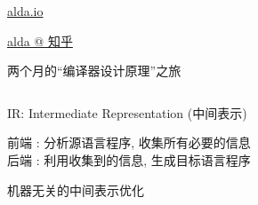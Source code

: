 \begin{frame}{}
  \begin{center}
    \href{https://alda.io/}{alda.io}


    \href{https://www.zhihu.com/zvideo/1467997225217908736}{alda @ 知乎}
  \end{center}
\end{frame}

\begin{frame}{}
  \begin{center}
    {\large 两个月的``编译器设计原理''之旅}

    \vspace{0.30cm}
    \begin{columns}
    \end{columns}
  \end{center}
\end{frame}


\begin{frame}{}
  \begin{center}
    IR: Intermediate Representation (中间表示)
    \vspace{0.50cm}


    \vspace{0.50cm}
    前端 : 分析源语言程序, 收集所有必要的信息 \\[8pt]
    后端 : 利用收集到的信息, 生成目标语言程序
  \end{center}
\end{frame}

\begin{frame}{}
  \begin{center}

    \vspace{0.50cm}
    机器无关的中间表示优化
  \end{center}
\end{frame}


